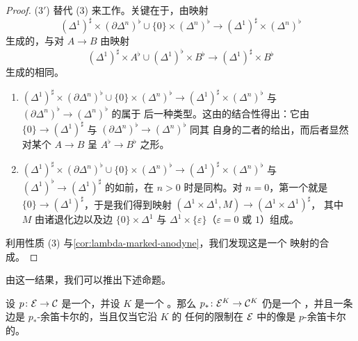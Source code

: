 \begin{proof}
(3$'$) 替代 (3) 来工作。关键在于，由映射
\[
(\Delta^1)^\sharp \times (\partial\Delta^n)^\flat
\cup \{0\} \times (\Delta^n)^\flat
\longrightarrow
(\Delta^1)^\sharp \times (\Delta^n)^\flat
\]
生成的\trSaturatedSet{}，与对\trMonomorphism{} $A \to B$ 由映射
\[
(\Delta^1)^\sharp \times A^\flat
\cup (\Delta^1)^\flat \times B^\flat
\longrightarrow
(\Delta^1)^\sharp \times B^\flat
\]
生成的\trSaturatedSet{}相同。
\begin{enumerate}[label=(\arabic*), resume]
  \item $(\Delta^1)^\sharp \times (\partial\Delta^n)^\flat \cup \{0\} \times (\Delta^n)^\flat \to (\Delta^1)^\sharp \times (\Delta^n)^\flat$ 与 $(\partial\Delta^n)^\flat \to (\Delta^n)^\flat$ 的\trPushoutProduct{}属于
        后一种类型。这由\trPushoutProduct{}的结合性得出：它由 $\{0\} \to (\Delta^1)^\sharp$ 与 $(\partial\Delta^n)^\flat \to (\Delta^n)^\flat$ 同其
        自身的\trPushoutProduct{}二者的\trPushoutProduct{}给出，而后者显然对某个%
        \trMonomorphism{} $A \to B$ 呈 $A^\flat \to B^\flat$ 之形。
  \item $(\Delta^1)^\sharp \times (\partial\Delta^n)^\flat \cup \{0\} \times (\Delta^n)^\flat \to (\Delta^1)^\sharp \times (\Delta^n)^\flat$ 与 $(\Delta^1)^\flat \to (\Delta^1)^\sharp$ 的\trPushoutProduct{}如前，在
        $n > 0$ 时是同构。对 $n = 0$，第一个\trPushoutProduct{}就是
        $\{0\} \to (\Delta^1)^\sharp$，于是我们得到映射
        $(\Delta^1 \times \Delta^1, M) \to (\Delta^1 \times \Delta^1)^\sharp$，
        其中 $M$ 由诸退化边以及边 $\{0\} \times \Delta^1$ 与
        $\Delta^1 \times \{\varepsilon\}$（$\varepsilon = 0$ 或 $1$）组成。
\end{enumerate}
利用性质 (3) 与\cref{cor:lambda-marked-anodyne}，我们发现这是一个%
\trMarkedLeftAnodyne{}映射的合成。
\end{proof}

由这一结果，我们可以推出下述命题。

\begin{proposition}\label{prop:functor-cocartesian-fibration}
设 $p\colon \mathcal{E} \to \mathcal{C}$ 是一个\trCocartesianFibration{}，并设 $K$ 是一个%
\trSimplicialSet{}。那么 $p_*\colon \mathcal{E}^K \to \mathcal{C}^K$ 仍是一个%
\trCocartesianFibration{}，并且一条边是 $p_*$-余笛卡尔的，当且仅当它沿 $K$ 的
任何\trObject{}的限制在 $\mathcal{E}$ 中的像是 $p$-余笛卡尔的。
\end{proposition}

